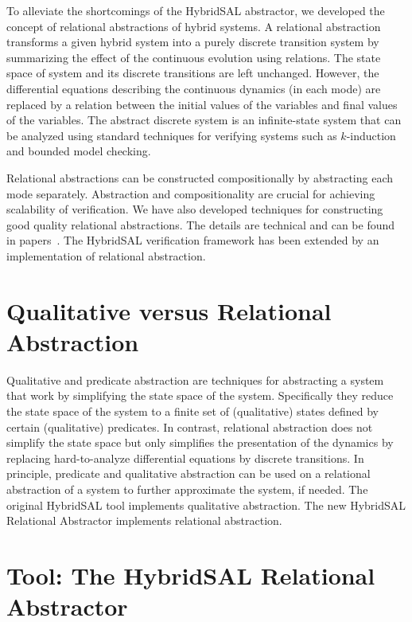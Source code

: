 \documentclass{article}
\begin{document}
To alleviate the shortcomings of the HybridSAL abstractor,
we developed the concept of relational abstractions of hybrid
systems.  A relational abstraction transforms a given hybrid system into
a purely discrete transition system by summarizing the effect
of the continuous evolution using relations.   The state space
of system and its discrete transitions are left unchanged. 
However, the differential equations describing the
continuous dynamics (in each mode) are replaced by a 
relation between the initial values of the variables and 
final values of the variables.
The abstract discrete system is an infinite-state system that can be
analyzed using standard techniques for verifying systems such
as $k$-induction and bounded model checking.

Relational abstractions can be constructed compositionally by 
abstracting each mode separately.  Abstraction and compositionality
are crucial for achieving scalability of verification.
We have also developed techniques for constructing good quality 
relational abstractions.  The details are technical and can be 
found in papers~\cite{ST11:CAV,Tiwari03:HSCC}.  The HybridSAL verification framework has 
been extended by an implementation of relational abstraction.


\section{Qualitative versus Relational Abstraction}

Qualitative and predicate abstraction are techniques for abstracting
a system that work by simplifying the state space of the system.
Specifically they reduce the state space of the system to a finite
set of (qualitative) states defined by certain (qualitative) predicates.
In contrast, relational abstraction does not simplify the state space
but only simplifies the presentation of the dynamics by replacing
hard-to-analyze differential equations by discrete transitions.
In principle, predicate and qualitative abstraction can be used on
a relational abstraction of a system to further approximate the
system, if needed.  The original HybridSAL tool implements qualitative
abstraction.  The new HybridSAL Relational Abstractor implements
relational abstraction. 


\section{Tool: The HybridSAL Relational Abstractor}
\end{document}
